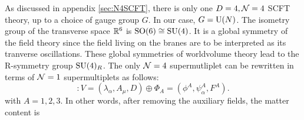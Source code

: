 \documentclass[a4paper,10pt]{article}
\begin{document}
        As discussed in appendix \ref{sec:N4SCFT}, there is only one $D=4,\mathcal{N}=4$ SCFT theory, up to a choice of gauge group $G$. In our case, $G=\text{U}(N)$. The isometry group of the transverse space $\mathbb{R}^6$ is $\text{SO}(6)\cong\text{SU}(4)$. It is a global symmetry of the field theory since the field living on the branes are to be interpreted as its tranverse oscillations. These global symmetries of worldvolume theory lead to the R-symmetry group $\text{SU}(4)_R$. The only $\mathcal{N}=4$ supermutliplet can be rewritten in terms of $\mathcal{N}=1$ supermultiplets as follows:
        \begin{equation}
            [\mN = 4 \text{ vector multiplet}] : V = (\lambda_\alpha, A_\mu, D) \oplus \Phi_A = (\phi^A,\psi^A_\alpha,F^A).
        \end{equation}
        with $A=1,2,3$. In other words, after removing the auxiliary fields, the matter content is
\end{document}
